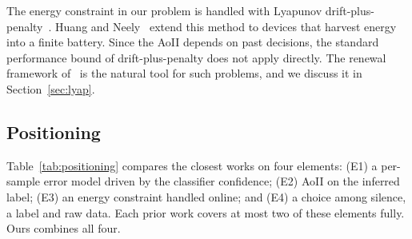 \documentclass[journal]{IEEEtran}
\theoremstyle{remark}
\begin{document}
The energy constraint in our problem is handled with Lyapunov drift-plus-penalty~\cite{neely2010book}. Huang and Neely~\cite{huang2013eh} extend this method to devices that harvest energy into a finite battery. Since the AoII depends on past decisions, the standard performance bound of drift-plus-penalty does not apply directly. The renewal framework of~\cite{neely2013renewal} is the natural tool for such problems, and we discuss it in Section~\ref{sec:lyap}.

\subsection{Positioning}
Table~\ref{tab:positioning} compares the closest works on four elements: (E1) a per-sample error model driven by the classifier confidence; (E2) AoII on the inferred label; (E3) an energy constraint handled online; and (E4) a choice among silence, a label and raw data. Each prior work covers at most two of these elements fully. Ours combines all four.

\begin{table}[t]
\caption{Positioning against the closest works. \checkmark: covered; $\circ$: partly covered; --: not covered.}
\label{tab:positioning}
\centering\footnotesize
\setlength{\tabcolsep}{3pt}
\end{table}
\end{document}
